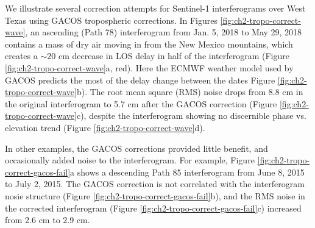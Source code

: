 We illustrate several correction attempts for Sentinel-1 interferograms over West Texas using GACOS tropospheric corrections.
In Figures \ref{fig:ch2-tropo-correct-wave}, an ascending (Path 78) interferogram from Jan. 5, 2018 to May 29, 2018 contains a mass of dry air moving in from the New Mexico mountains, which creates a $\sim 20$ cm decrease in LOS delay in half of the interferogram (Figure \ref{fig:ch2-tropo-correct-wave}a, red).
Here the ECMWF weather model used by GACOS predicts the most of the delay change between the dates Figure \ref{fig:ch2-tropo-correct-wave}b). 
The root mean square (RMS) noise drops from 8.8 cm in the original interferogram to 5.7 cm after the GACOS correction (Figure \ref{fig:ch2-tropo-correct-wave}c), despite the interferogram showing no discernible phase vs. elevation trend (Figure \ref{fig:ch2-tropo-correct-wave}d). 

 
In other examples, the GACOS corrections provided little benefit, and occasionally added noise to the interferogram. For example, Figure \ref{fig:ch2-tropo-correct-gacos-fail}a shows a descending Path 85 interferogram from June 8, 2015 to July 2, 2015. The GACOS correction is not correlated with the interferogram nosie structure (Figure \ref{fig:ch2-tropo-correct-gacos-fail}b), and the RMS noise in the corrected interferogram (Figure \ref{fig:ch2-tropo-correct-gacos-fail}c) increased from 2.6 cm to 2.9 cm.


